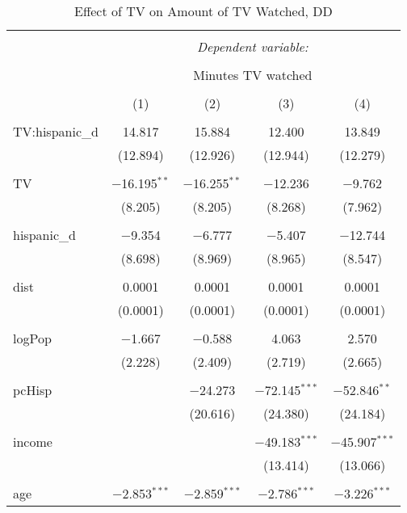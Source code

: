 
\begin{table}[!htbp] \centering 
  \caption{Effect of TV on Amount of TV Watched, DD} 
  \label{} 
\begin{tabular}{@{\extracolsep{-5pt}}lcccc} 
\\[-1.8ex]\hline 
\hline \\[-1.8ex] 
 & \multicolumn{4}{c}{\textit{Dependent variable:}} \\ 
\cline{2-5} 
\\[-1.8ex] & \multicolumn{4}{c}{Minutes TV watched} \\ 
\\[-1.8ex] & (1) & (2) & (3) & (4)\\ 
\hline \\[-1.8ex] 
 TV:hispanic\_d & 14.817 & 15.884 & 12.400 & 13.849 \\ 
  & (12.894) & (12.926) & (12.944) & (12.279) \\ 
  & & & & \\ 
 TV & $-$16.195$^{**}$ & $-$16.255$^{**}$ & $-$12.236 & $-$9.762 \\ 
  & (8.205) & (8.205) & (8.268) & (7.962) \\ 
  & & & & \\ 
 hispanic\_d & $-$9.354 & $-$6.777 & $-$5.407 & $-$12.744 \\ 
  & (8.698) & (8.969) & (8.965) & (8.547) \\ 
  & & & & \\ 
 dist & 0.0001 & 0.0001 & 0.0001 & 0.0001 \\ 
  & (0.0001) & (0.0001) & (0.0001) & (0.0001) \\ 
  & & & & \\ 
 logPop & $-$1.667 & $-$0.588 & 4.063 & 2.570 \\ 
  & (2.228) & (2.409) & (2.719) & (2.665) \\ 
  & & & & \\ 
 pcHisp &  & $-$24.273 & $-$72.145$^{***}$ & $-$52.846$^{**}$ \\ 
  &  & (20.616) & (24.380) & (24.184) \\ 
  & & & & \\ 
 income &  &  & $-$49.183$^{***}$ & $-$45.907$^{***}$ \\ 
  &  &  & (13.414) & (13.066) \\ 
  & & & & \\ 
 age & $-$2.853$^{***}$ & $-$2.859$^{***}$ & $-$2.786$^{***}$ & $-$3.226$^{***}$ \\ 

\end{tabular}
\end{table}
